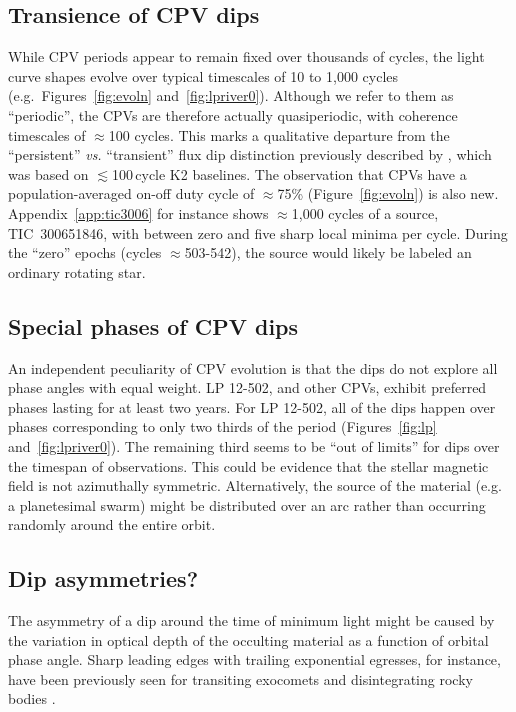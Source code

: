 \documentclass[11pt,twocolumn,tighten]{aastex63}
\begin{document}
\subsection{Transience of CPV dips}

While CPV periods appear to remain fixed over thousands of cycles, the
light curve shapes evolve over typical timescales of 10 to 1{,}000
cycles (e.g.\ Figures~\ref{fig:evoln} and~\ref{fig:lpriver0}).
Although we refer to them as ``periodic'', the CPVs are therefore
actually quasiperiodic, with coherence timescales of $\approx$100
cycles.  This marks a qualitative departure from the ``persistent''
{\it vs.} ``transient'' flux dip distinction previously described by
\citet{2017AJ....153..152S}, which was based on $\lesssim$100\,cycle
K2 baselines.  The observation that CPVs have a population-averaged
on-off duty cycle of $\approx$75\% (Figure~\ref{fig:evoln}) is also
new.  Appendix~\ref{app:tic3006} for instance shows $\approx$1{,}000
cycles of a source, TIC~300651846, with between zero and five sharp
local minima per cycle.  During the ``zero'' epochs (cycles
$\approx$503-542), the source would likely be labeled an ordinary
rotating star.


\subsection{Special phases of CPV dips}

An independent peculiarity of CPV evolution is that the dips do not
explore all phase angles with equal weight.  LP 12-502, and other
CPVs, exhibit preferred phases lasting for at least two years.  For LP
12-502, all of the dips happen over phases corresponding to only two
thirds of the period (Figures~\ref{fig:lp} and~\ref{fig:lpriver0}).
The remaining third seems to be ``out of limits'' for dips over the
timespan of observations.  This could be evidence that the stellar
magnetic field is not azimuthally symmetric.  Alternatively, the
source of the material (e.g. a planetesimal swarm) might be
distributed over an arc rather than occurring randomly around the
entire orbit.  


\subsection{Dip asymmetries?}

The asymmetry of a dip around the time of minimum light might be
caused by the variation in optical depth of the occulting material as
a function of orbital phase angle.  Sharp leading edges with trailing
exponential egresses, for instance, have been previously seen for
transiting exocomets and disintegrating rocky bodies
\citep[e.g.][]{2012ApJ...752....1R,2012A&A...545L...5B,2015Natur.526..546V,2019A&A...625L..13Z}.
\end{document}
